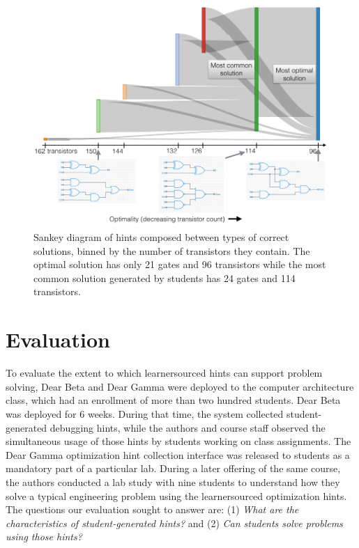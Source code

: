 \begin{figure}
\centering
\includegraphics[width=1.0\columnwidth]{Body/figures/classoverflow/annotated_Sankey_onecolumn.png}
\caption{Sankey diagram of hints composed between types of correct solutions, binned by the number of transistors they contain. The optimal solution has only 21 gates and 96 transistors while the most common solution generated by students has 24 gates and 114 transistors.}
\label{fig:sankey}
\end{figure}


\section{Evaluation}

To evaluate the extent to which learnersourced hints can support problem solving, Dear Beta and Dear Gamma were deployed to the computer architecture class, which had an enrollment of more than two hundred students. Dear Beta was deployed for 6 weeks. During that time, the system collected student-generated debugging hints, while the authors and course staff observed the simultaneous usage of those hints by students working on class assignments. The Dear Gamma optimization hint collection interface was released to students as a mandatory part of a particular lab. During a later offering of the same course, the authors conducted a lab study with nine students to understand how they solve a typical engineering problem using the learnersourced optimization hints. The questions our evaluation sought to answer are: (1) {\it What are the characteristics of student-generated hints?} and (2) {\it Can students solve problems using those hints?}

